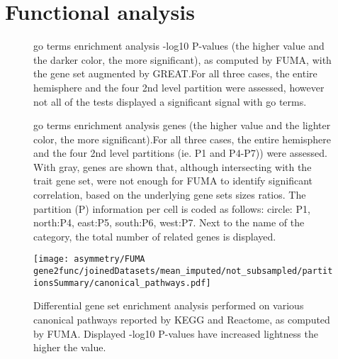 \chapter{Functional analysis}
\begin{figure}[H]
	\centering
	\quad
	\quad
	\caption[GO terms GSEA -log10P values]{\Ac{go} terms enrichment analysis -log10 P-values (the higher value and the darker color, the more significant), as computed by FUMA, with the gene set augmented by GREAT.For all three cases, the entire hemisphere and the four 2nd level partition were assessed, however not all of the tests displayed a significant signal with \ac{go} terms.}
	\label{fig:go}
\end{figure}
\begin{figure}[H]
	\centering
	\quad
	\quad
	\caption[GO terms GSEA genes]{\Ac{go} terms enrichment analysis genes (the higher value and the lighter color, the more significant).For all three cases, the entire hemisphere and the four 2nd level partitions (ie. P1 and P4-P7)) were assessed. With gray, genes are shown that, although intersecting with the trait gene set, were not enough for FUMA to identify significant correlation, based on the underlying gene sets sizes ratios. The partition (P) information per cell is coded as follows: circle: P1, north:P4, east:P5, south:P6, west:P7. Next to the name of the category, the total number of related genes is displayed.}
	\label{fig:go_genes}
\end{figure}
\begin{figure}[H]
	\centering
	\texttt{[image: asymmetry/FUMA gene2func/joinedDatasets/mean\_imputed/not\_subsampled/partitionsSummary/canonical\_pathways.pdf]}
	
	\caption[Canonical pathways GSEA -log10P values]{Differential gene set enrichment analysis performed on various canonical pathways reported by KEGG and Reactome, as computed by FUMA. Displayed -log10 P-values have increased lightness the higher the value.}
	\label{fig:can_pathways}
\end{figure}
